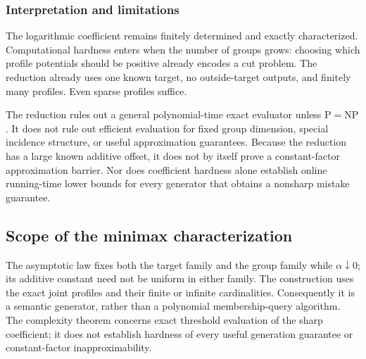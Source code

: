 \subsubsection{Interpretation and limitations}
The logarithmic coefficient remains finitely determined and exactly characterized. Computational hardness enters when the number of groups grows: choosing which profile potentials should be positive already encodes a cut problem. The reduction already uses one known target, no outside-target outputs, and finitely many profiles. Even sparse profiles suffice.

The reduction rules out a general polynomial-time exact evaluator unless $\mathrm P=\mathrm{NP}$. It does not rule out efficient evaluation for fixed group dimension, special incidence structure, or useful approximation guarantees. Because the reduction has a large known additive offset, it does not by itself prove a constant-factor approximation barrier. Nor does coefficient hardness alone establish online running-time lower bounds for every generator that obtains a nonsharp mistake guarantee.



\subsection{Scope of the minimax characterization}
The asymptotic law fixes both the target family and the group family while $\alpha\downarrow0$; its additive constant need not be uniform in either family. The construction uses the exact joint profiles and their finite or infinite cardinalities. Consequently it is a semantic generator, rather than a polynomial membership-query algorithm. The complexity theorem concerns exact threshold evaluation of the sharp coefficient; it does not establish hardness of every useful generation guarantee or constant-factor inapproximability.
